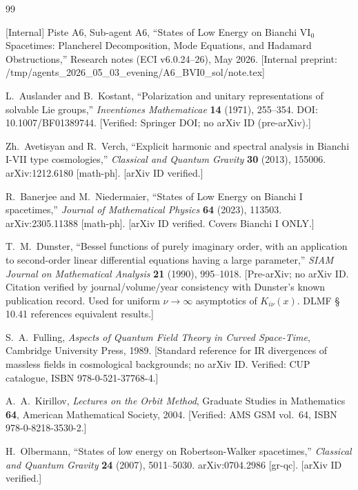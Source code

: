 \documentclass[11pt,a4paper]{article}
\theoremstyle{definition}
\begin{document}
\begin{thebibliography}{99}

  [Internal] Piste A6, Sub-agent A6,
  ``States of Low Energy on Bianchi $\mathrm{VI_0}$ Spacetimes: Plancherel
  Decomposition, Mode Equations, and Hadamard Obstructions,''
  Research notes (ECI v6.0.24--26), May 2026.
  [Internal preprint: /tmp/agents\_2026\_05\_03\_evening/A6\_BVI0\_sol/note.tex]

  L.~Auslander and B.~Kostant,
  ``Polarization and unitary representations of solvable Lie groups,''
  \emph{Inventiones Mathematicae} \textbf{14} (1971), 255--354.
  DOI: 10.1007/BF01389744.
  [Verified: Springer DOI; no arXiv ID (pre-arXiv).]

  Zh.~Avetisyan and R.~Verch,
  ``Explicit harmonic and spectral analysis in Bianchi I-VII type cosmologies,''
  \emph{Classical and Quantum Gravity} \textbf{30} (2013), 155006.
  arXiv:1212.6180 [math-ph].
  [arXiv ID verified.]

  R.~Banerjee and M.~Niedermaier,
  ``States of Low Energy on Bianchi I spacetimes,''
  \emph{Journal of Mathematical Physics} \textbf{64} (2023), 113503.
  arXiv:2305.11388 [math-ph].
  [arXiv ID verified. Covers Bianchi I ONLY.]

  T.~M.~Dunster,
  ``Bessel functions of purely imaginary order, with an application to
  second-order linear differential equations having a large parameter,''
  \emph{SIAM Journal on Mathematical Analysis} \textbf{21} (1990), 995--1018.
  [Pre-arXiv; no arXiv ID. Citation verified by journal/volume/year consistency
   with Dunster's known publication record. Used for uniform $\nu\to\infty$ asymptotics
   of $K_{i\nu}(x)$. DLMF \S\,10.41 references equivalent results.]

  S.~A.~Fulling,
  \emph{Aspects of Quantum Field Theory in Curved Space-Time},
  Cambridge University Press, 1989.
  [Standard reference for IR divergences of massless fields in cosmological backgrounds;
   no arXiv ID. Verified: CUP catalogue, ISBN 978-0-521-37768-4.]

  A.~A.~Kirillov,
  \emph{Lectures on the Orbit Method},
  Graduate Studies in Mathematics \textbf{64},
  American Mathematical Society, 2004.
  [Verified: AMS GSM vol.~64, ISBN 978-0-8218-3530-2.]

  H.~Olbermann,
  ``States of low energy on Robertson-Walker spacetimes,''
  \emph{Classical and Quantum Gravity} \textbf{24} (2007), 5011--5030.
  arXiv:0704.2986 [gr-qc].
  [arXiv ID verified.]


\end{thebibliography}
\end{document}
